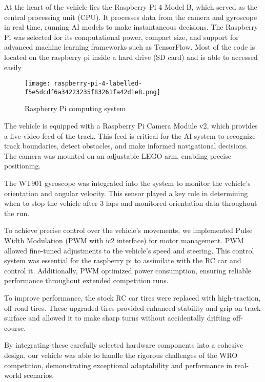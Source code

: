 \documentclass{article}
\begin{document}
\begin{multicols}{2}
At the heart of the vehicle lies the Raspberry Pi 4 Model B, which served as the central processing unit (CPU). It processes data from the camera and gyroscope in real time, running AI models to make instantaneous decisions. The Raspberry Pi was selected for its computational power, compact size, and support for advanced machine learning frameworks such as TensorFlow. Most of the code is located on the raspberry pi inside a hard drive (SD card) and is able to accessed easily

\begin{figure}[H]
            \centering
            \texttt{[image: raspberry-pi-4-labelled-f5e5dcdf6a34223235f83261fa42d1e8.png]}
            \caption*{Raspberry Pi computing system}
        \end{figure}

The vehicle is equipped with a Raspberry Pi Camera Module v2, which provides a live video feed of the track. This feed is critical for the AI system to recognize track boundaries, detect obstacles, and make informed navigational decisions. The camera was mounted on an adjustable LEGO arm, enabling precise positioning.

The WT901 gyroscope was integrated into the system to monitor the vehicle’s orientation and angular velocity. This sensor played a key role in determining when to stop the vehicle after 3 laps and monitored orientation data throughout the run.

To achieve precise control over the vehicle’s movements, we implemented Pulse Width Modulation (PWM with ic2 interface) for motor management. PWM allowed fine-tuned adjustments to the vehicle's speed and steering. This control system was essential for the raspberry pi to assimilate with the RC car and control it. Additionally, PWM optimized power consumption, ensuring reliable performance throughout extended competition runs.

To improve performance, the stock RC car tires were replaced with high-traction, off-road tires. These upgraded tires provided enhanced stability and grip on track surface and allowed it to make sharp turns without accidentally drifting off-course.

By integrating these carefully selected hardware components into a cohesive design, our vehicle was able to handle the rigorous challenges of the WRO competition, demonstrating exceptional adaptability and performance in real-world scenarios.


    \newpage


\end{multicols}
\end{document}
